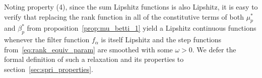 \documentclass[10pt]{article}
\numberwithin{equation}{section}
\newcommand{\+}{%
	\raisebox{0.18ex}{\scaleobj{0.55}{+}}
}
\theoremstyle{definition}
\newtheorem{definition}{Definition}
\theoremstyle{definition}
\newcommand\numberthis{\addtocounter{equation}{1}\tag{\theequation}}
\begin{document}
\noindent Noting property (4), since the sum Lipshitz functions is also Lipshitz, it is easy to verify that 
replacing the rank function in all of the constitutive terms of both $\mu_p^\ast$ and $\beta_p^{\ast}$ from proposition~\ref{prop:mu_betti_1} yield a Lipshitz continuous functions whenever the filter function $f_\alpha$ is itself Lipshitz and the step functions from~\eqref{eq:rank_equiv_param} are smoothed with some $\omega > 0$. 
We defer the formal definition of such a relaxation and its properties to section~\ref{sec:spri_properties}.
\end{document}
